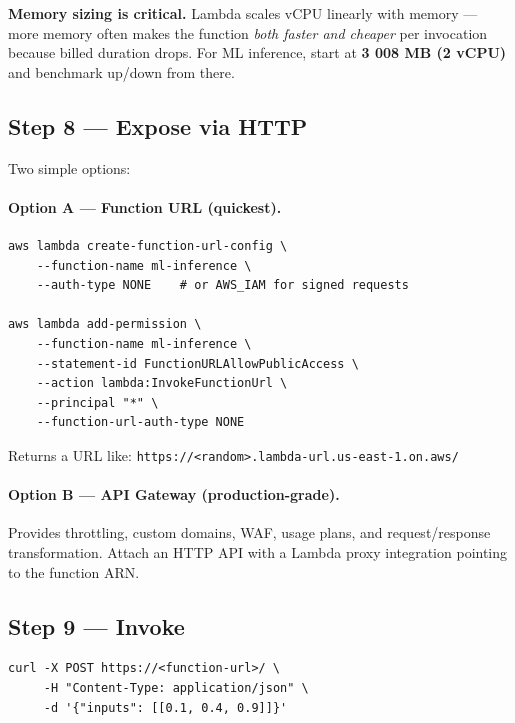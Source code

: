 \documentclass[11pt,a4paper]{article}
\begin{document}
\begin{notebox}
\textbf{Memory sizing is critical.} Lambda scales vCPU linearly with memory ---
more memory often makes the function \emph{both faster and cheaper} per
invocation because billed duration drops. For ML inference, start at
\textbf{3 008 MB (2 vCPU)} and benchmark up/down from there.
\end{notebox}

\subsection{Step 8 --- Expose via HTTP}

Two simple options:

\paragraph{Option A --- Function URL (quickest).}

\begin{lstlisting}[style=bashcode]
aws lambda create-function-url-config \
    --function-name ml-inference \
    --auth-type NONE    # or AWS_IAM for signed requests

aws lambda add-permission \
    --function-name ml-inference \
    --statement-id FunctionURLAllowPublicAccess \
    --action lambda:InvokeFunctionUrl \
    --principal "*" \
    --function-url-auth-type NONE
\end{lstlisting}

Returns a URL like:
\texttt{https://<random>.lambda-url.us-east-1.on.aws/}

\paragraph{Option B --- API Gateway (production-grade).}
Provides throttling, custom domains, WAF, usage plans, and request/response
transformation. Attach an HTTP API with a Lambda proxy integration pointing to
the function ARN.

\subsection{Step 9 --- Invoke}

\begin{lstlisting}[style=bashcode]
curl -X POST https://<function-url>/ \
     -H "Content-Type: application/json" \
     -d '{"inputs": [[0.1, 0.4, 0.9]]}'
\end{lstlisting}
\end{document}
